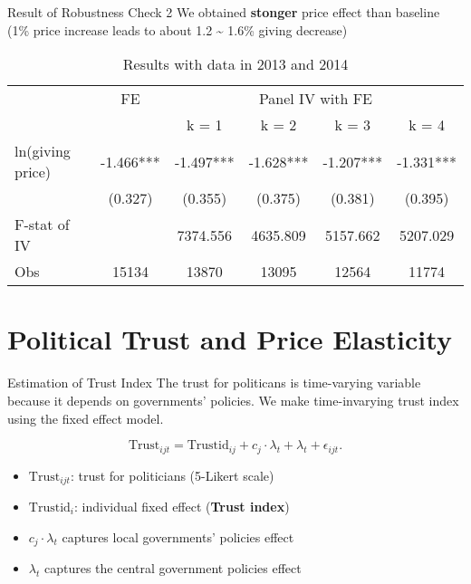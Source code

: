 \documentclass[
  ignorenonframetext,
]{beamer}
\providecommand{\tightlist}{%
  \setlength{\itemsep}{0pt}\setlength{\parskip}{0pt}}
\begin{document}
\begin{frame}{Result of Robustness Check 2}
\protect\hypertarget{result-of-robustness-check-2}{}
We obtained \textbf{stonger} price effect than baseline (1\% price
increase leads to about 1.2 \textasciitilde{} 1.6\% giving decrease)

\begin{table}

\caption{\label{tab:kableRobust2EstimateElasticity}Results with data in 2013 and 2014}
\centering
\fontsize{9}{11}\selectfont
\begin{tabular}[t]{lccccc}
\toprule
\multicolumn{1}{c}{ } & \multicolumn{1}{c}{FE} & \multicolumn{4}{c}{Panel IV with FE} \\
\cmidrule(l{3pt}r{3pt}){2-2} \cmidrule(l{3pt}r{3pt}){3-6}
 &  & k = 1 & k = 2 & k = 3 & k = 4\\
\midrule
ln(giving price) & -1.466*** & -1.497*** & -1.628*** & -1.207*** & -1.331***\\
 & (0.327) & (0.355) & (0.375) & (0.381) & (0.395)\\
F-stat of IV &  & 7374.556 & 4635.809 & 5157.662 & 5207.029\\
Obs & 15134 & 13870 & 13095 & 12564 & 11774\\
\bottomrule
\end{tabular}
\end{table}
\end{frame}

\hypertarget{political-trust-and-price-elasticity}{%
\section{Political Trust and Price
Elasticity}\label{political-trust-and-price-elasticity}}

\begin{frame}{Estimation of Trust Index}
\protect\hypertarget{estimation-of-trust-index}{}
The trust for politicans is time-varying variable because it depends on
governments' policies. We make time-invarying trust index using the
fixed effect model.

\[
    \text{Trust}_{ijt} = \text{Trustid}_{ij} + c_j \cdot \lambda_t + \lambda_t + \epsilon_{ijt}.
\]

\begin{itemize}
\tightlist
\item
  \(\text{Trust}_{ijt}\): trust for politicians (5-Likert scale)
\item
  \(\text{Trustid}_i\): individual fixed effect (\textbf{Trust index})
\item
  \(c_j \cdot \lambda_t\) captures local governments' policies effect
\item
  \(\lambda_t\) captures the central government policies effect
\end{itemize}
\end{frame}
\end{document}
